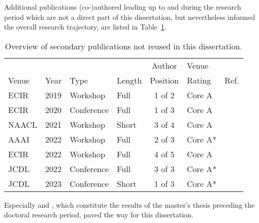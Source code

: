 Additional publications (co-)authored leading up to and during the research period which are not a direct part of this dissertation, but nevertheless informed the overall research trajectory, are listed in Table~\ref{tab:secondarypublicationoverview}.

\begin{table}[h]
\centering
  \caption{Overview of secondary publications not reused in this dissertation.}
  \label{tab:secondarypublicationoverview}
  \begin{tabular}{llllclr}
    \hline
    \ & \ & \ & \ & Author & Venue & \ \\
    Venue & Year & Type & Length & Position & Rating & Ref. \\
    \hline
    ECIR & 2019 & Workshop & Full & 1 of 2 & Core A & \cite{Saier2019} \\
    ECIR & 2020 & Conference & Full & 1 of 3 & Core A & \cite{Saier2020a} \\
    NAACL & 2021 & Workshop & Short & 3 of 4 & Core A & \cite{Krause2021} \\
    AAAI & 2022 & Workshop & Full & 2 of 3 & Core A* & \cite{Shapiro2022} \\
    ECIR & 2022 & Workshop & Full & 4 of 5 & Core A & \cite{Faerber2022bir} \\
    JCDL & 2022 & Conference & Full & 3 of 3 & Core A* & \cite{Nishioka2022} \\
    JCDL & 2023 & Conference & Short & 1 of 3 & Core A* & \cite{Saier2023cocon} \\
    \hline
    \end{tabular}
\end{table}

Especially \cite{Saier2019} and \cite{Krause2021}, which constitute the results of the master's thesis preceding the doctoral research period, paved the way for this dissertation.
